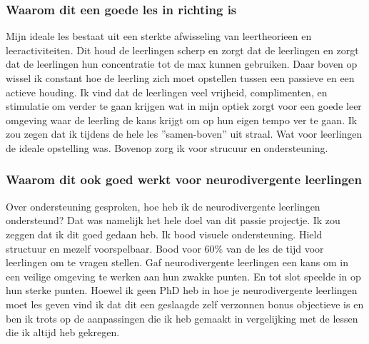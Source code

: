            \subsubsection{Waarom dit een goede les in richting is}
                Mijn ideale les bestaat uit een sterkte afwisseling van leertheorieen en leeractiviteiten. Dit houd de leerlingen scherp en zorgt dat de leerlingen en zorgt dat de leerlingen hun concentratie tot de max kunnen gebruiken. Daar boven op wissel ik constant hoe de leerling zich moet opstellen tussen een passieve en een actieve houding. Ik vind dat de leerlingen veel vrijheid, complimenten, en stimulatie om verder te gaan krijgen wat in mijn optiek zorgt voor een goede leer omgeving waar de leerling de kans krijgt om op hun eigen tempo ver te gaan. Ik zou zegen dat ik tijdens de hele les ”samen-boven” uit straal. Wat voor leerlingen de ideale opstelling was.\cite{samen-boven-leads-to-better-results} Bovenop zorg ik voor strucuur en ondersteuning.

            \subsubsection{Waarom dit ook goed werkt voor neurodivergente leerlingen}
                Over ondersteuning gesproken, hoe heb ik de neurodivergente leerlingen ondersteund? Dat was namelijk het hele doel van dit passie projectje. Ik zou zeggen dat ik dit goed gedaan heb. Ik bood visuele ondersteuning. Hield structuur en mezelf voorspelbaar. Bood voor 60\% van de les de tijd voor leerlingen om te vragen stellen. Gaf neurodivergente leerlingen een kans om in een veilige omgeving te werken aan hun zwakke punten. En tot slot speelde in op hun sterke punten. Hoewel ik geen PhD heb in hoe je neurodivergente leerlingen moet les geven vind ik dat dit een geslaagde zelf verzonnen bonus objectieve is en ben ik trots op de aanpassingen die ik heb gemaakt in vergelijking met de lessen die ik altijd heb gekregen.
            